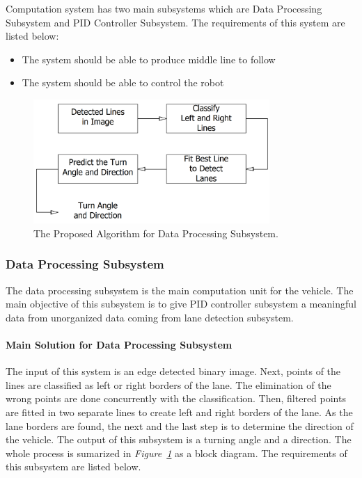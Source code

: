 \documentclass[a4paper,12pt]{article}
\begin{document}
	Computation system has two main subsystems which are Data Processing Subsystem and PID Controller Subsystem. The requirements of this system are listed below:
	\begin{itemize}
		\item The system should	be able to produce middle line to follow
		\item The system should be able to control the robot
	\end{itemize}	
	
		\begin{figure}[t]
		\center
		\setlength{\unitlength}{\textwidth} 
		\includegraphics[width=0.8\textwidth]{v-models/data_processing_subsystem}
		\caption{\label{fig:data_processing_subsystem}The Proposed Algorithm for Data Processing Subsystem.}
	\end{figure}
	\subsubsection{Data Processing Subsystem}
	
		The data processing subsystem is the main computation unit for the vehicle. The main objective of this subsystem is to give PID controller subsystem a meaningful data from unorganized data coming from lane detection subsystem. 
	
	\paragraph{Main Solution for Data Processing Subsystem}
	
	The input of this system is an edge detected binary image.  Next, points of the lines are classified as left or right borders of the lane. The elimination of the wrong points are done concurrently with the classification. Then, filtered points are fitted in two separate lines to create left and right borders of the lane. As the lane borders are found, the next and the last step is to determine the direction of the vehicle. The output of this subsystem is a turning angle and a direction. The whole process is sumarized in \textit{Figure~\ref{fig:data_processing_subsystem}} as a block diagram. The requirements of this subsystem are listed below.\\
	
\end{document}
